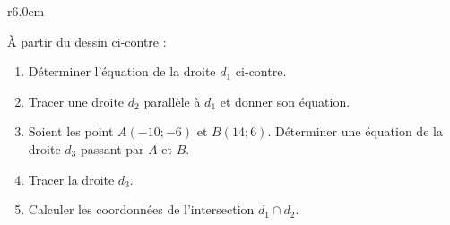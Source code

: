 
\begin{exercice}\label{exosmath-0606}

\begin{wrapfigure}{r}{6.0cm}
   \vspace{-1cm}        %
   \centering
   
\end{wrapfigure}

À partir du dessin ci-contre :
\begin{enumerate}
    \item
        Déterminer l'équation de la droite \( d_1\) ci-contre.
    \item
        Tracer une droite \( d_2\) parallèle à \( d_1\) et donner son équation.
    \item
        Soient les point \( A(-10;-6)\) et \( B(14;6)\). Déterminer une équation de la droite \( d_3\) passant par \( A\) et \( B\).
    \item
        Tracer la droite \( d_3\).
    \item
        Calculer les coordonnées de l'intersection \( d_1\cap d_2\).
\end{enumerate}


\end{exercice}
